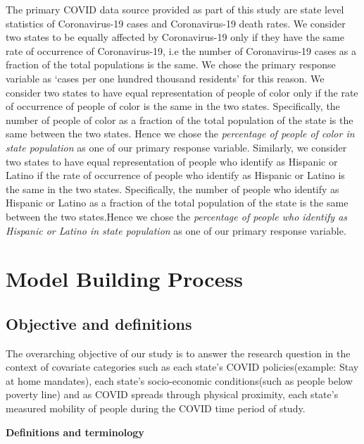 \documentclass[
]{article}
\begin{document}
The primary COVID data source provided as part of this study are state
level statistics of Coronavirus-19 cases and Coronavirus-19 death rates.
We consider two states to be equally affected by Coronavirus-19 only if
they have the same rate of occurrence of Coronavirus-19, i.e the number
of Coronavirus-19 cases as a fraction of the total populations is the
same. We chose the primary response variable as `cases per one hundred
thousand residents' for this reason. We consider two states to have
equal representation of people of color only if the rate of occurrence
of people of color is the same in the two states. Specifically, the
number of people of color as a fraction of the total population of the
state is the same between the two states. Hence we chose the
\emph{percentage of people of color in state population} as one of our
primary response variable. Similarly, we consider two states to have
equal representation of people who identify as Hispanic or Latino if the
rate of occurrence of people who identify as Hispanic or Latino is the
same in the two states. Specifically, the number of people who identify
as Hispanic or Latino as a fraction of the total population of the state
is the same between the two states.Hence we chose the \emph{percentage
of people who identify as Hispanic or Latino in state population} as one
of our primary response variable.

\newpage

\hypertarget{model-building-process}{%
\section{Model Building Process}\label{model-building-process}}

\hypertarget{objective-and-definitions}{%
\subsection{Objective and definitions}\label{objective-and-definitions}}

The overarching objective of our study is to answer the research
question in the context of covariate categories such as each state's
COVID policies(example: Stay at home mandates), each state's
socio-economic conditions(such as people below poverty line) and as
COVID spreads through physical proximity, each state's measured mobility
of people during the COVID time period of study.

\textbf{Definitions and terminology}
\end{document}

